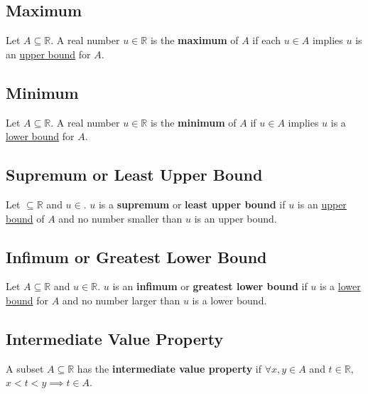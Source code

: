 \documentclass[11pt]{book}
\newcommand{\R}{\mathbb{R}}
\begin{document}
	\subsection{Maximum}
	\label{subsec:maximum}
		\begin{defin}
			Let $A \subseteq \R$. A real number $u \in \R$ is the \textbf{maximum} of $A$ if each $u \in A$ implies $u$ is an \hyperref[subsec:upperbound]{upper bound}
			for $A$.
		\end{defin}
	\subsection{Minimum}
	\label{subsec:minimum}
		\begin{defin}
			Let $A \subseteq \R$. A real number $u \in \R$ is the \textbf{minimum} of $A$ if $u \in A$ implies $u$ is a \hyperref[subsec:lowerbound]{lower bound} for $A$.
		\end{defin}
	\subsection{Supremum or Least Upper Bound}
	\label{subsec:supremum}
		\begin{defin}
			Let $ \subseteq \R$ and $u \in $. $u$ is a \textbf{supremum} or \textbf{least upper bound} if $u$ is an \hyperref[subsec:upperbound]{upper bound}
			of $A$ and no number smaller than $u$ is an upper bound.
		\end{defin}
	\subsection{Infimum or Greatest Lower Bound}
	\label{subsec:infimum}
		\begin{defin}
			Let $A \subseteq \R$ and $u \in \R$. $u$ is an \textbf{infimum} or \textbf{greatest lower bound} if $u$ is a \hyperref[subsec:lowerbound]{lower bound} for
			$A$ and no number larger than $u$ is a lower bound.
		\end{defin}
	\subsection{Intermediate Value Property}
	\label{subsec:intermediatevalueproperty}
		\begin{defin}
			A subset $A \subseteq \R$ has the \textbf{intermediate value property} if $\forall x,y \in A$ and $t \in \R$, $x < t < y \implies t \in A$.
		\end{defin}
\newpage
\end{document}
